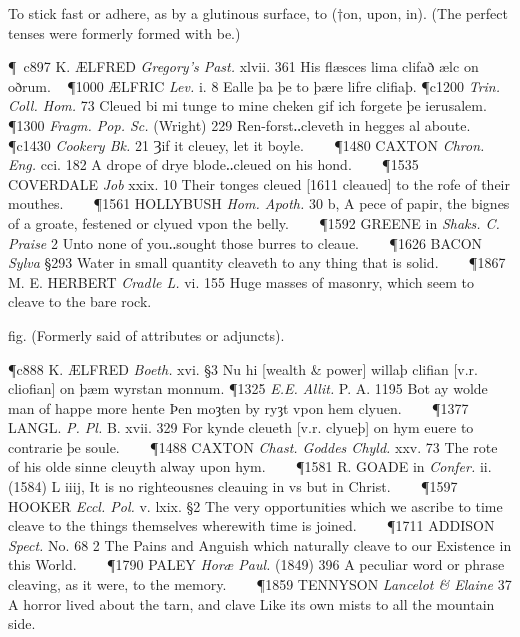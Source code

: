 \begin{description}[wide, labelwidth=!, labelindent=0pt]
\begin{myenumerate}





 To stick fast or adhere, as by a glutinous surface, to (†on, upon, in). (The perfect tenses were formerly formed with be.)

\P c897 K. ÆLFRED \textit{Gregory's Past.} xlvii. 361 His flæsces lima clifað ælc on oðrum.  
\P 1000 ÆLFRIC  \textit{Lev.} i. 8 Ealle þa  þe to þære lifre clifiaþ.
\P c1200 \textit{Trin.  Coll. Hom.} 73 Cleued bi mi tunge to mine cheken gif ich forgete þe ierusalem.
\P 1300 \textit{Fragm.  Pop. Sc.} (Wright) 229 Ren-forst‥cleveth in hegges al aboute.
\P c1430 \textit{Cookery  Bk.} 21 Ȝif it cleuey, let it boyle.    
\P 1480 CAXTON  \textit{Chron. Eng.} cci. 182 A drope of drye blode‥cleued on his hond.    
\P 1535 COVERDALE  \textit{Job} xxix. 10 Their tonges cleued [1611 cleaued]  to the rofe of their mouthes.    
\P 1561 HOLLYBUSH  \textit{Hom. Apoth.} 30 b, A pece of papir, the bignes of a groate, festened or clyued vpon the belly.    
\P 1592 GREENE in  \textit{Shaks. C. Praise} 2 Unto none of you‥sought those burres to cleaue.    
\P 1626 BACON  \textit{Sylva} §293 Water in small quantity cleaveth to any thing that is solid.    
\P 1867 M. E. HERBERT  \textit{Cradle L.} vi. 155 Huge masses of masonry, which seem to cleave to the bare rock.

 fig. (Formerly said of attributes or adjuncts).

\P c888 K. ÆLFRED \textit{Boeth.} xvi. §3 Nu hi [wealth \& power] willaþ clifian [v.r. cliofian] on þæm wyrstan monnum.
\P 1325  \textit{E.E. Allit.} P. A. 1195 Bot ay wolde man of happe more hente Þen moȝten by ryȝt vpon hem clyuen.    
\P 1377 LANGL.  \textit{P. Pl.} B. xvii. 329 For kynde cleueth [v.r. clyueþ] on hym euere to contrarie þe soule.    
\P 1488 CAXTON  \textit{Chast. Goddes Chyld.} xxv. 73 The rote of his olde sinne cleuyth alway upon hym.    
\P 1581 R. GOADE in \textit{Confer.} ii. (1584) L iiij, It is no righteousnes cleauing in vs but in Christ.    
\P 1597 HOOKER  \textit{Eccl. Pol.} v. lxix. §2 The very opportunities which we ascribe to time cleave to the things themselves wherewith time is joined.    
\P 1711 ADDISON  \textit{Spect.} No. 68 2 The Pains and Anguish which naturally cleave to our Existence in this World.    
\P 1790 PALEY  \textit{Horæ Paul.} (1849) 396 A peculiar word or phrase cleaving, as it were, to the memory.    
\P 1859 TENNYSON  \textit{Lancelot \& Elaine} 37 A horror lived about the tarn, and clave Like its own mists to all the mountain side.


\end{myenumerate}
\end{description}
